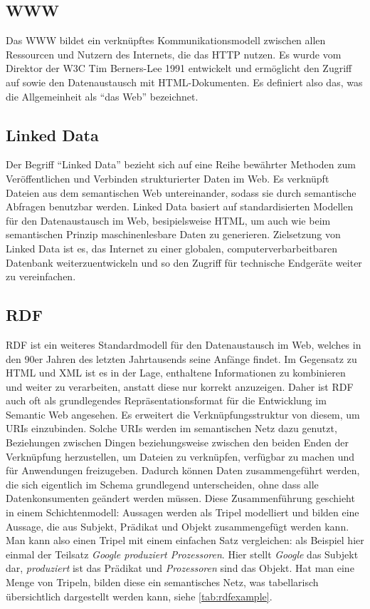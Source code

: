 \documentclass[headsepline,titlepage,ngerman,twoside,12pt]{report}
\begin{document}
\subsection{\acs{WWW}}
\label{sec:www}
Das \ac{WWW} bildet ein verknüpftes Kommunikationsmodell zwischen allen Ressourcen und Nutzern des Internets, die das \ac{HTTP} nutzen.
Es wurde vom Direktor der \ac{W3C} Tim Berners-Lee 1991 entwickelt und ermöglicht den Zugriff auf sowie den Datenaustausch mit \acs{HTML}-Dokumenten.
Es definiert also das, was die Allgemeinheit als \enquote{das Web} bezeichnet.


\subsection{Linked Data}
\label{sec:linkeddata}
Der Begriff \enquote{Linked Data} bezieht sich auf eine Reihe bewährter Methoden zum Veröffentlichen und Verbinden strukturierter Daten im Web.
Es verknüpft Dateien aus dem semantischen Web untereinander, sodass sie durch semantische Abfragen benutzbar werden.
Linked Data basiert auf standardisierten Modellen für den Datenaustausch im Web, besipielsweise \acs{HTML}, um auch wie beim semantischen Prinzip maschinenlesbare Daten zu generieren.
Zielsetzung von Linked Data ist es, das Internet zu einer globalen, computerverbarbeitbaren Datenbank weiterzuentwickeln und so den Zugriff für technische Endgeräte weiter zu vereinfachen.

\subsection{\acs{RDF}}
\label{sec:rdf}
\ac{RDF} ist ein weiteres Standardmodell für den Datenaustausch im Web, welches in den 90er Jahren des letzten Jahrtausends seine Anfänge findet.
Im Gegensatz zu \ac{HTML} und \ac{XML} ist es in der Lage, enthaltene Informationen zu kombinieren und weiter zu verarbeiten, anstatt diese nur korrekt anzuzeigen.
Daher ist RDF auch oft als grundlegendes Repräsentationsformat für die Entwicklung im Semantic Web angesehen.
Es erweitert die Verknüpfungsstruktur von diesem, um \ac{URIs} einzubinden.
Solche URIs werden im semantischen Netz dazu genutzt, Beziehungen zwischen Dingen beziehungsweise zwischen den beiden Enden der Verknüpfung herzustellen, um Dateien zu verknüpfen, verfügbar zu machen und für Anwendungen freizugeben.
Dadurch können Daten zusammengeführt werden, die sich eigentlich im Schema grundlegend unterscheiden, ohne dass alle Datenkonsumenten geändert werden müssen.
Diese Zusammenführung geschieht in einem Schichtenmodell: Aussagen werden als Tripel modelliert und bilden eine Aussage, die aus Subjekt, Prädikat und Objekt zusammengefügt werden kann.
Man kann also einen Tripel mit einem einfachen Satz vergleichen: als Beispiel hier einmal der Teilsatz \textit{Google produziert Prozessoren}.
Hier stellt \textit{Google} das Subjekt dar, \textit{produziert} ist das Prädikat und \textit{Prozessoren} sind das Objekt.
Hat man eine Menge von Tripeln, bilden diese ein semantisches Netz, was tabellarisch übersichtlich dargestellt werden kann, siehe \cref{tab:rdfexample}.
\end{document}
